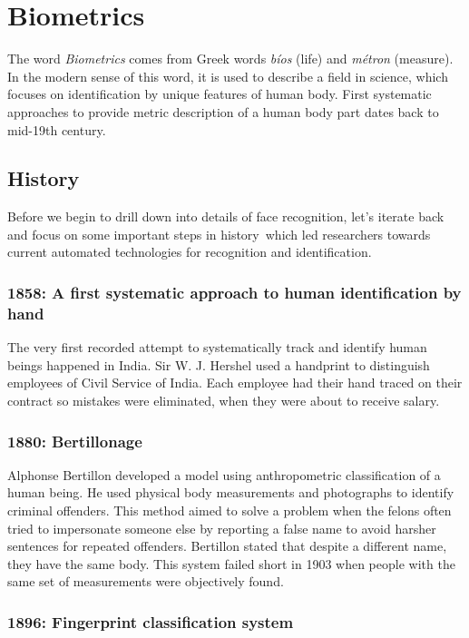 \section{Biometrics}

The word \textit{Biometrics} comes from Greek words \textit{bíos} (life) and \textit{métron} (measure). In the modern sense of this word, it is used to describe a field in science, which focuses on identification by unique features of human body. First systematic approaches to provide metric description of a human body part dates back to mid-19th century.

\subsection{History}

Before we begin to drill down into details of face recognition, let's iterate back and focus on some important steps in history\,\cite{history} which led researchers towards current automated technologies for recognition and identification.

\subsubsection{1858: A first systematic approach to human identification by hand}

The very first recorded attempt to systematically track and identify human beings happened in India. Sir W. J. Hershel used a handprint to distinguish employees of Civil Service of India. Each employee had their hand traced on their contract so mistakes were eliminated, when they were about to receive salary.

\subsubsection{1880: Bertillonage}

Alphonse Bertillon developed a model using anthropometric classification of a human being. He used physical body measurements and photographs to identify criminal offenders. This method aimed to solve a problem when the felons often tried to impersonate someone else by reporting a false name to avoid harsher sentences for repeated offenders. Bertillon stated that despite a different name, they have the same body. This system failed short in 1903 when people with the same set of measurements were objectively found.

\subsubsection{1896: Fingerprint classification system}

